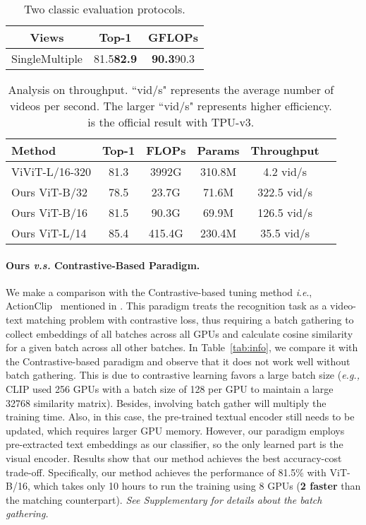 \documentclass[letterpaper]{article} \usepackage{aaai23}  \usepackage{times}  \usepackage{helvet}  \usepackage{courier}  \usepackage[hyphens]{url}  \usepackage{graphicx} \urlstyle{rm} \def\UrlFont{\rm}  \usepackage{natbib}  \usepackage{caption} \frenchspacing  \setlength{\pdfpagewidth}{8.5in}  \setlength{\pdfpageheight}{11in}  \usepackage{algorithm}
\newcommand{\ie}{\textit{i}.\textit{e}.}
\begin{document}
\begin{table}[t]
    \centering
    \begin{tabular}{ccc} 
    \toprule
     Views  & Top-1 & GFLOPs \\ \midrule
      SingleMultiple  & 81.5\textbf{82.9} & \textbf{90.3}90.3\x12  \\
    \bottomrule 
    \end{tabular} 
    \caption{Two classic evaluation protocols.}
    \label{table:views} 
\end{table}



\begin{table}[t]
    \centering
    \footnotesize
    \begin{tabular}{lccccc} 
    \toprule
      Method    & Top-1 & FLOPs & Params & Throughput \\ \midrule
ViViT-L/16-320	& 81.3  &	3992G &	310.8M	& 4.2 vid/s \\ 
Ours ViT-B/32 	& 78.5  &	23.7G &	71.6M	& 322.5 vid/s \\
Ours ViT-B/16 	& 81.5  &	90.3G &	69.9M	& 126.5 vid/s \\
Ours ViT-L/14 	& 85.4  &	415.4G &	230.4M &	35.5 vid/s \\ \bottomrule
    \end{tabular}
    \caption{Analysis on throughput. ``vid/s" represents the average number of videos per second. The larger ``vid/s" represents higher efficiency.  is the official result with TPU-v3. }
    \label{table:runtime} 
\end{table}

\paragraph{Ours \emph{v.s.} Contrastive-Based Paradigm.}
We make a comparison with the Contrastive-based tuning method \ie, ActionClip~\cite{wang2021actionclip} mentioned in . This paradigm treats the recognition task as a video-text matching problem with contrastive loss, thus requiring a batch gathering to collect embeddings of all batches across all GPUs and calculate cosine similarity for a given batch across all other batches. 
In Table~\ref{tab:info}, we compare it with the Contrastive-based paradigm and
observe that it does not work well without batch gathering. This is due to contrastive learning favors a large batch size (\emph{e.g.,} CLIP used 256 GPUs with a batch size of 128 per GPU to maintain a large 32768 similarity matrix).
Besides, involving batch gather will multiply the training time.
Also, in this case, the pre-trained textual encoder still needs to be updated, which requires larger GPU memory.
However, our paradigm employs pre-extracted text embeddings as our classifier, so the only learned part is the visual encoder.
Results show that our method achieves the best accuracy-cost trade-off. Specifically, our method achieves the performance of 81.5\% with ViT-B/16, which takes only 10 hours to run the training using 8 GPUs (\textbf{2 faster} than the matching counterpart).
\emph{See Supplementary for details about the batch gathering.}
\end{document}
